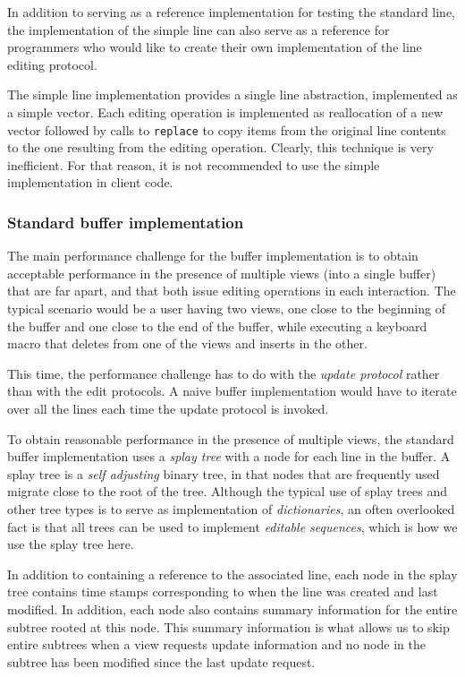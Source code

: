 In addition to serving as a reference implementation for testing the
standard line, the implementation of the simple line can also serve as
a reference for programmers who would like to create their own
implementation of the line editing protocol.

The simple line implementation provides a single line abstraction,
implemented as a \commonlisp{} simple vector.  Each editing operation
is implemented as reallocation of a new vector followed by calls to
\texttt{replace} to copy items from the original line contents to the
one resulting from the editing operation.  Clearly, this technique is
very inefficient.  For that reason, it is not recommended to use the
simple implementation in client code.

\subsubsection{Standard buffer implementation}

The main performance challenge for the buffer implementation is to
obtain acceptable performance in the presence of multiple views (into
a single buffer) that are far apart, and that both issue editing
operations in each interaction.  The typical scenario would be a user
having two views, one close to the beginning of the buffer and one
close to the end of the buffer, while executing a keyboard macro that
deletes from one of the views and inserts in the other.

This time, the performance challenge has to do with the \emph{update
  protocol} rather than with the edit protocols.  A naive buffer
implementation would have to iterate over all the lines each time the
update protocol is invoked.

To obtain reasonable performance in the presence of multiple views,
the standard buffer implementation uses a \emph{splay tree}
\cite{Sleator:1985:SBS:3828.3835} with a node for each line in the
buffer.  A splay tree is a \emph{self adjusting} binary tree, in that
nodes that are frequently used migrate close to the root of the tree.
Although the typical use of splay trees and other tree types is to
serve as implementation of \emph{dictionaries}, an often overlooked
fact is that all trees can be used to implement \emph{editable
  sequences}, which is how we use the splay tree here.

In addition to containing a reference to the associated line, each
node in the splay tree contains time stamps corresponding to when the
line was created and last modified.  In addition, each node also
contains summary information for the entire subtree rooted at this
node.  This summary information is what allows us to skip entire
subtrees when a view requests update information and no node in the
subtree has been modified since the last update request.

